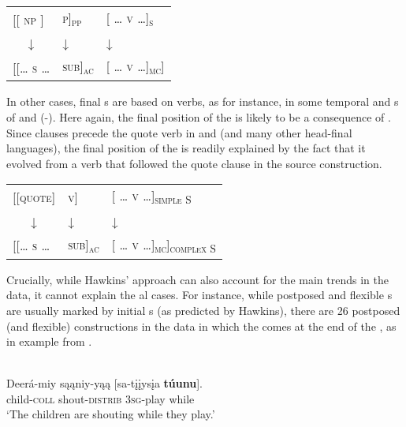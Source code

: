\documentclass[output=paper]{langsci/langscibook}
\begin{document}
\ea\label{ex:diessel:19}
\begin{tabular}[t]{@{}l@{ }ll@{}}
{[[ \textsc{np} ]}  &   {\textsc{p]\textsubscript{pp}}} & {[ \textsc{… v …]\textsubscript{s}}} \\
\multicolumn{1}{c}{↓}  & ↓ & {[ \textsc{… }}↓\\
{[\textsc{[… s …}} & {\textsc{sub]\textsubscript{ac}}} &  {[ \textsc{… v …]\textsubscript{mc}}]}\\
\end{tabular}
\z

In other cases, final s are based on  verbs, as for instance, in some temporal and s of  and  (-). Here again, the final position of the  is likely to be a consequence of . Since  clauses precede the quote verb in  and  (and many other head-final languages), the final position of the  is readily explained by the fact that it evolved from a  verb that followed the quote clause in the source construction. 

\ea\label{ex:diessel:20}
\begin{tabular}[t]{@{}l@{ }ll@{}}
{[\textsc{[quote]}} &   {\textsc{v]}}  & {[ \textsc{… v …]\textsubscript{simple S}}}\\
\multicolumn{1}{c}{↓}  & ↓ & {[ \textsc{… }}↓\\
{[[\textsc{… s …}} & {\textsc{sub]\textsubscript{ac}}} &  {[ \textsc{… v …]\textsubscript{mc}]\textsubscript{complex S}}}\\
\end{tabular}
\z

Crucially, while Hawkins’  approach can also account for the main trends in the data, it cannot explain the al cases. For instance, while postposed and flexible s are usually marked by initial s (as predicted by Hawkins), there are 26 postposed (and flexible)  constructions in the data in which the  comes at the end of the , as in example  from .

\ea\label{ex:diessel:21}
\\
\gll   Deerá-miy  sąąniy-yąą  [sa-tįįysįa  \textbf{túunu}].\\
       child-\textsc{coll}  shout-\textsc{distrib}  3\textsc{sg}-play  while\\
\glt   `The children are shouting while they play.'
\z
\end{document}
